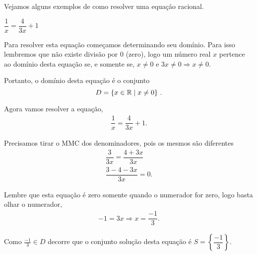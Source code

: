  Vejamos alguns exemplos de como resolver uma equação racional.
 
 \begin{exem} $\dfrac{1}{x}= \dfrac{4}{3x} + 1$
 
 Para resolver esta equação começamos determinando seu domínio. Para isso lembremos que não existe divisão por $0$ (zero), logo um número real $x$ pertence ao domínio desta equação se, e somente se, 
 $x \neq 0$ e $3x \neq 0 \Rightarrow x \neq 0$.
 
 Portanto, o domínio desta equação é o conjunto
 \[D= \{ x \in \mathbb{R} \mid x \neq 0 \} \ . \]
 
 Agora vamos resolver a equação,
 \begin{eqnarray*}
 \dfrac{1}{x} = \dfrac{4}{3x} + 1.
 \end{eqnarray*}
 
 Precisamos tirar o MMC dos denominadores, pois os mesmos são diferentes
 \begin{eqnarray*}
 \dfrac{3}{3x}= \dfrac{4 + 3x}{3x} \\
 \dfrac{3-4-3x}{3x} = 0.
 \end{eqnarray*}
 
 Lembre que esta equação é zero somente quando o numerador for zero, logo basta olhar o numerador,
 \begin{eqnarray*}
 -1 = 3x \Rightarrow x= \dfrac{-1}{3}.
 \end{eqnarray*}
 
 Como $\frac{-1}{3} \in D$ decorre que o conjunto solução desta equação é $S= \left\{ \dfrac{-1}{3} \right\}$.
 \end{exem}
 
 
 
 
 

